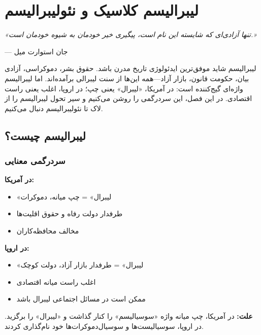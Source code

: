 
\chapter{لیبرالیسم کلاسیک و نئولیبرالیسم}
\label{ch:liberalism}

\begin{flushright}
\textit{«تنها آزادی‌ای که شایسته این نام است، پیگیری خیر خودمان به شیوه خودمان است.»}

— جان استوارت میل
\end{flushright}


\lettrine[lines=3, lraise=0.1, nindent=0.5em]{\textcolor{CenterGreen}{ل}}{یبرالیسم} 
شاید موفق‌ترین ایدئولوژی تاریخ مدرن باشد. حقوق بشر، دموکراسی، آزادی بیان، حکومت قانون، بازار آزاد—همه این‌ها از سنت لیبرالی برآمده‌اند. اما لیبرالیسم واژه‌ای گیج‌کننده است: در آمریکا، «لیبرال» یعنی چپ؛ در اروپا، اغلب یعنی راست اقتصادی. در این فصل، این سردرگمی را روشن می‌کنیم و سیر تحول لیبرالیسم را از لاک تا نئولیبرالیسم دنبال می‌کنیم.

\section{لیبرالیسم چیست؟}

\subsection{سردرگمی معنایی}

\begin{warningbox}
\textbf{در آمریکا:}
\begin{itemize}[nosep]
    \item «لیبرال» = چپ میانه، دموکرات
    \item طرفدار دولت رفاه و حقوق اقلیت‌ها
    \item مخالف محافظه‌کاران
\end{itemize}

\textbf{در اروپا:}
\begin{itemize}[nosep]
    \item «لیبرال» = طرفدار بازار آزاد، دولت کوچک
    \item اغلب راست میانه اقتصادی
    \item ممکن است در مسائل اجتماعی لیبرال باشد
\end{itemize}

\textbf{علت:} در آمریکا، چپ میانه واژه «سوسیالیسم» را کنار گذاشت و «لیبرال» را برگزید. در اروپا، سوسیالیست‌ها و سوسیال‌دموکرات‌ها خود نام‌گذاری کردند.
\end{warningbox}

